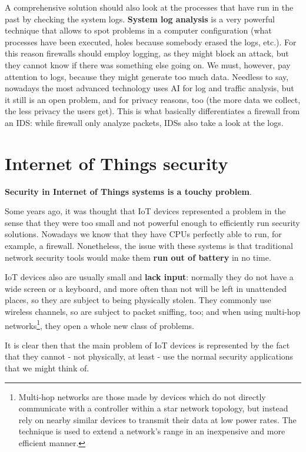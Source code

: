 A comprehensive solution should also look at the processes that have run in the past by checking the system logs. \textbf{System log analysis} is a very powerful technique that allows to spot problems in a computer configuration (what processes have been executed, holes because somebody erased the logs, etc.). For this reason firewalls should employ logging, as they might block an attack, but they cannot know if there was something else going on. We must, however, pay attention to logs, because they might generate too much data. Needless to say, nowadays the most advanced technology uses AI for log and traffic analysis, but it still is an open problem, and for privacy reasons, too (the more data we collect, the less privacy the users get). This is what basically differentiates a firewall from an IDS: while firewall only analyze packets, IDSs also take a look at the logs.


\section{Internet of Things security}
\textbf{Security in Internet of Things systems is a touchy problem}.

Some years ago, it was thought that IoT devices represented a problem in the sense that they were too small and not powerful enough to efficiently run security solutions. Nowadays we know that they have CPUs perfectly able to run, for example, a firewall. Nonetheless, the issue with these systems is that traditional network security tools would make them \textbf{run out of battery} in no time.

IoT devices also are usually small and \textbf{lack input}: normally they do not have a wide screen or a keyboard, and more often than not will be left in unattended places, so they are subject to being physically stolen. They commonly use wireless channels, so are subject to packet sniffing, too; and when using multi-hop networks\footnote{ Multi-hop networks are those made by devices which do not directly communicate with a controller within a star network topology, but instead rely on nearby similar devices to transmit their data at low power rates. The technique is used to extend a network’s range in an inexpensive and more efficient manner.}, they open a whole new class of problems.

It is clear then that the main problem of IoT devices is represented by the fact that they cannot - not physically, at least - use the normal security applications that we might think of.

